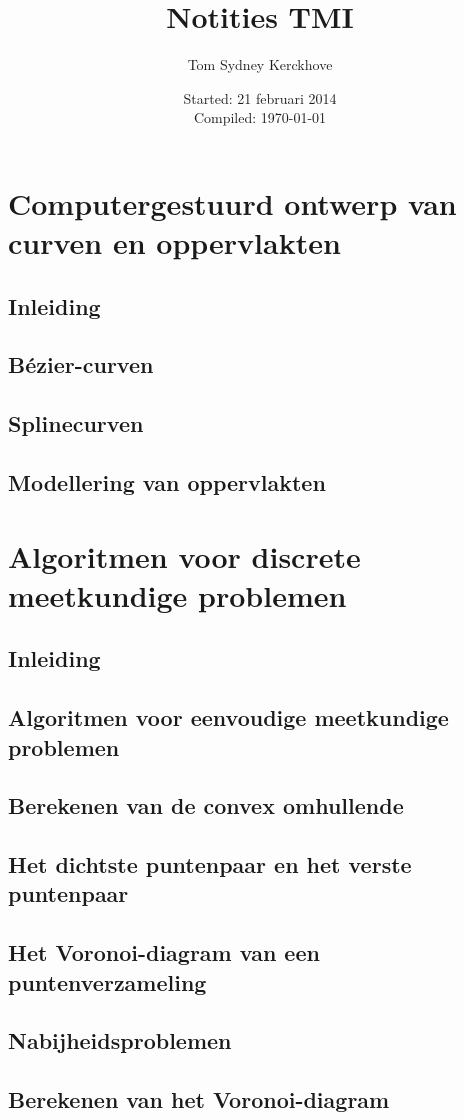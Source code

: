 \documentclass[10pt,a4paper]{book}
\author{Tom Sydney Kerckhove}
\title{Notities TMI}
\date{Started: 21 februari 2014\\ Compiled: \today}
\begin{document}
\maketitle
\tableofcontents

\part{Computergestuurd ontwerp van curven en oppervlakten}
\chapter{Inleiding}
\chapter{B\'ezier-curven}
\chapter{Splinecurven}
\chapter{Modellering van oppervlakten}

\part{Algoritmen voor discrete meetkundige problemen}
\chapter{Inleiding}
\chapter{Algoritmen voor eenvoudige meetkundige problemen}
\chapter{Berekenen van de convex omhullende}
\chapter{Het dichtste puntenpaar en het verste puntenpaar}
\chapter{Het Voronoi-diagram van een puntenverzameling}
\chapter{Nabijheidsproblemen}
\chapter{Berekenen van het Voronoi-diagram}
\end{document}
